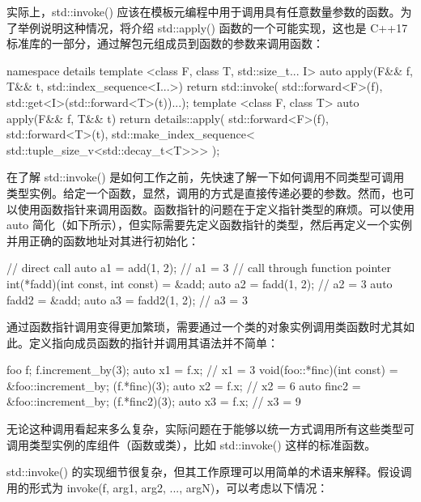 实际上，std::invoke() 应该在模板元编程中用于调用具有任意数量参数的函数。为了举例说明这种情况，将介绍 std::apply() 函数的一个可能实现，这也是 C++17 标准库的一部分，通过解包元组成员到函数的参数来调用函数：

\begin{cpp}
namespace details
{
    template <class F, class T, std::size_t... I>
    auto apply(F&& f, T&& t, std::index_sequence<I...>)
    {
        return std::invoke(
        std::forward<F>(f),
        std::get<I>(std::forward<T>(t))...);
    }
}
template <class F, class T>
auto apply(F&& f, T&& t)
{
    return details::apply(
    std::forward<F>(f),
    std::forward<T>(t),
    std::make_index_sequence<
    std::tuple_size_v<std::decay_t<T>>> {});
}
\end{cpp}


在了解 std::invoke() 是如何工作之前，先快速了解一下如何调用不同类型可调用类型实例。给定一个函数，显然，调用的方式是直接传递必要的参数。然而，也可以使用函数指针来调用函数。函数指针的问题在于定义指针类型的麻烦。可以使用 auto 简化（如下所示），但实际需要先定义函数指针的类型，然后再定义一个实例并用正确的函数地址对其进行初始化：

\begin{cpp}
// direct call
auto a1 = add(1, 2);    // a1 = 3
// call through function pointer
int(*fadd)(int const, int const) = &add;
auto a2 = fadd(1, 2);   // a2 = 3
auto fadd2 = &add;
auto a3 = fadd2(1, 2);  // a3 = 3
\end{cpp}

通过函数指针调用变得更加繁琐，需要通过一个类的对象实例调用类函数时尤其如此。定义指向成员函数的指针并调用其语法并不简单：

\begin{cpp}
foo f;
f.increment_by(3);
auto x1 = f.x;    // x1 = 3
void(foo::*finc)(int const) = &foo::increment_by;
(f.*finc)(3);
auto x2 = f.x;    // x2 = 6
auto finc2 = &foo::increment_by;
(f.*finc2)(3);
auto x3 = f.x;    // x3 = 9
\end{cpp}

无论这种调用看起来多么复杂，实际问题在于能够以统一方式调用所有这些类型可调用类型实例的库组件（函数或类），比如 std::invoke() 这样的标准函数。

std::invoke() 的实现细节很复杂，但其工作原理可以用简单的术语来解释。假设调用的形式为 invoke(f, arg1, arg2, ..., argN)，可以考虑以下情况：

